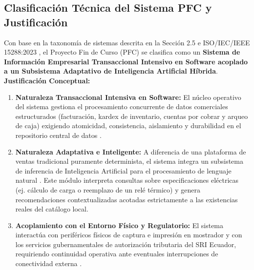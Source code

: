 \subsection{Clasificación Técnica del Sistema PFC y Justificación}
Con base en la taxonomía de sistemas descrita en la Sección 2.5 e ISO/IEC/IEEE 15288:2023 \cite{ieee15288, pohl2025}, el Proyecto Fin de Curso (PFC) se clasifica como un \textbf{Sistema de Información Empresarial Transaccional Intensivo en Software acoplado a un Subsistema Adaptativo de Inteligencia Artificial Híbrida}.
\textbf{Justificación Conceptual:}
\begin{enumerate}
	\item \textbf{Naturaleza Transaccional Intensiva en Software:} El núcleo operativo del sistema gestiona el procesamiento concurrente de datos comerciales estructurados (facturación, kardex de inventario, cuentas por cobrar y arqueo de caja) exigiendo atomicidad, consistencia, aislamiento y durabilidad en el repositorio central de datos \cite{ieee12207, swebok2024}.
	\item \textbf{Naturaleza Adaptativa e Inteligente:} A diferencia de una plataforma de ventas tradicional puramente determinista, el sistema integra un subsistema de inferencia de Inteligencia Artificial para el procesamiento de lenguaje natural \cite{pohl2025}. Este módulo interpreta consultas sobre especificaciones eléctricas (ej. cálculo de carga o reemplazo de un relé térmico) y genera recomendaciones contextualizadas acotadas estrictamente a las existencias reales del catálogo local.
	\item \textbf{Acoplamiento con el Entorno Físico y Regulatorio:} El sistema interactúa con periféricos físicos de captura e impresión en mostrador y con los servicios gubernamentales de autorización tributaria del SRI Ecuador, requiriendo continuidad operativa ante eventuales interrupciones de conectividad externa \cite{iso25010}.
\end{enumerate}
